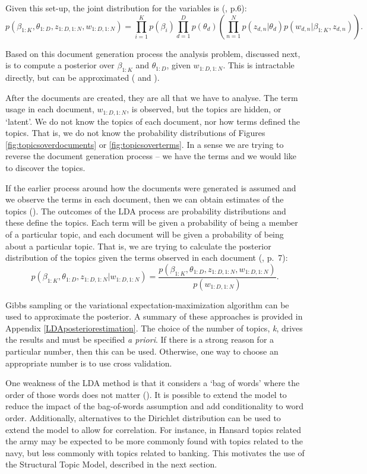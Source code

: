 \documentclass[12pt,]{article}
\theoremstyle{definition}
\theoremstyle{definition}
\theoremstyle{definition}
\theoremstyle{remark}
\begin{document}
Given this set-up, the joint distribution for the variables is
(\citet{blei2012}, p.6):
\[p(\beta_{1:K}, \theta_{1:D}, z_{1:D, 1:N}, w_{1:D, 1:N}) = \prod^{K}_{i=1}p(\beta_i) \prod^{D}_{d=1}p(\theta_d) \left(\prod^N_{n=1}p(z_{d,n}|\theta_d)p\left(w_{d,n}|\beta_{1:K},z_{d,n}\right) \right).\]

Based on this document generation process the analysis problem,
discussed next, is to compute a posterior over \(\beta_{1:K}\) and
\(\theta_{1:D}\), given \(w_{1:D, 1:N}\). This is intractable directly,
but can be approximated (\citet{GriffithsSteyvers2004} and
\citet{blei2012}).

After the documents are created, they are all that we have to analyse.
The term usage in each document, \(w_{1:D, 1:N}\), is observed, but the
topics are hidden, or `latent'. We do not know the topics of each
document, nor how terms defined the topics. That is, we do not know the
probability distributions of Figures \ref{fig:topicsoverdocuments} or
\ref{fig:topicsoverterms}. In a sense we are trying to reverse the
document generation process -- we have the terms and we would like to
discover the topics.

If the earlier process around how the documents were generated is
assumed and we observe the terms in each document, then we can obtain
estimates of the topics (\citet{SteyversGriffiths2006}). The outcomes of
the LDA process are probability distributions and these define the
topics. Each term will be given a probability of being a member of a
particular topic, and each document will be given a probability of being
about a particular topic. That is, we are trying to calculate the
posterior distribution of the topics given the terms observed in each
document (\citet{blei2012}, p.~7):
\[p(\beta_{1:K}, \theta_{1:D}, z_{1:D, 1:N} | w_{1:D, 1:N}) = \frac{p\left(\beta_{1:K}, \theta_{1:D}, z_{1:D, 1:N}, w_{1:D, 1:N}\right)}{p(w_{1:D, 1:N})}.\]

Gibbs sampling or the variational expectation-maximization algorithm can
be used to approximate the posterior. A summary of these approaches is
provided in Appendix \ref{LDAposteriorestimation}. The choice of the
number of topics, \emph{k}, drives the results and must be specified
\emph{a priori}. If there is a strong reason for a particular number,
then this can be used. Otherwise, one way to choose an appropriate
number is to use cross validation.

One weakness of the LDA method is that it considers a `bag of words'
where the order of those words does not matter (\citet{blei2012}). It is
possible to extend the model to reduce the impact of the bag-of-words
assumption and add conditionality to word order. Additionally,
alternatives to the Dirichlet distribution can be used to extend the
model to allow for correlation. For instance, in Hansard topics related
the army may be expected to be more commonly found with topics related
to the navy, but less commonly with topics related to banking. This
motivates the use of the Structural Topic Model, described in the next
section.
\end{document}
